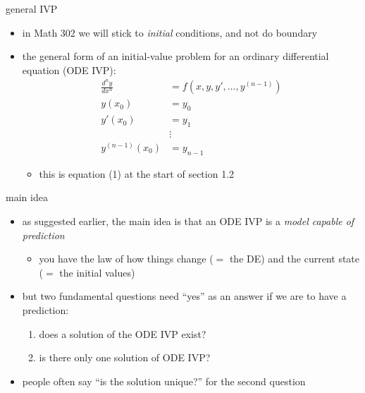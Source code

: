 \documentclass{beamer}
\begin{document}
\begin{frame}{general IVP}

\begin{itemize}
\item in Math 302 we will stick to \emph{initial} conditions, and not do boundary 
\item the general form of an initial-value problem for an ordinary differential equation (ODE IVP):
\begin{align*}
\frac{d^n y}{dx^n} &= f(x,y,y',\dots,y^{(n-1)}) \\
y(x_0) &= y_0 \\
y'(x_0) &= y_1 \\
   &\vdots \\
y^{(n-1)}(x_0) &= y_{n-1}
\end{align*}

\vspace{-1mm}
     \begin{itemize}
     \item this is equation (1) at the start of section 1.2
     \end{itemize}
\end{itemize}
\end{frame}


\begin{frame}{main idea}

\begin{itemize}
\item as suggested earlier, the main idea is that an ODE IVP is a \emph{model capable of prediction}
    \begin{itemize}
    \item you have the law of how things change ($=$ the DE) and the current state ($=$ the initial values)
    \end{itemize}
\item but two fundamental questions need ``yes'' as an answer if we are to have a prediction:
    \begin{enumerate}
    \item does a solution of the ODE IVP exist?
    \item is there only one solution of ODE IVP?
    \end{enumerate}
\item people often say ``is the solution unique?'' for the second question
\end{itemize}
\end{frame}
\end{document}
